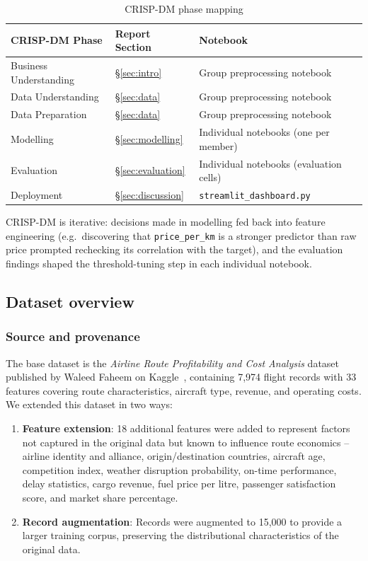 \documentclass[12pt,a4paper]{article}
\begin{document}
\begin{table}[H]
  \centering
  \caption{CRISP-DM phase mapping}
  \label{tab:crispdm}
  \small
  \begin{tabular}{L{3cm} L{4.5cm} L{5cm}}
    \toprule
    \textbf{CRISP-DM Phase} & \textbf{Report Section} & \textbf{Notebook} \\
    \midrule
    Business Understanding & \S\ref{sec:intro} & Group preprocessing notebook \\
    Data Understanding     & \S\ref{sec:data} & Group preprocessing notebook \\
    Data Preparation       & \S\ref{sec:data} & Group preprocessing notebook \\
    Modelling              & \S\ref{sec:modelling} & Individual notebooks (one per member) \\
    Evaluation             & \S\ref{sec:evaluation} & Individual notebooks (evaluation cells) \\
    Deployment             & \S\ref{sec:discussion} & \texttt{streamlit\_dashboard.py} \\
    \bottomrule
  \end{tabular}
\end{table}

CRISP-DM is iterative: decisions made in modelling fed back into feature engineering (e.g.\ discovering that \texttt{price\_per\_km} is a stronger predictor than raw price prompted rechecking its correlation with the target), and the evaluation findings shaped the threshold-tuning step in each individual notebook.

\subsection{Dataset overview}
\label{subsec:dataset}

\subsubsection{Source and provenance}

The base dataset is the \emph{Airline Route Profitability and Cost Analysis} dataset published by Waleed Faheem on Kaggle~\cite{faheem2024kaggle}, containing 7,974 flight records with 33 features covering route characteristics, aircraft type, revenue, and operating costs. We extended this dataset in two ways:

\begin{enumerate}[leftmargin=*]
  \item \textbf{Feature extension}: 18 additional features were added to represent factors not captured in the original data but known to influence route economics -- airline identity and alliance, origin/destination countries, aircraft age, competition index, weather disruption probability, on-time performance, delay statistics, cargo revenue, fuel price per litre, passenger satisfaction score, and market share percentage.
  \item \textbf{Record augmentation}: Records were augmented to 15,000 to provide a larger training corpus, preserving the distributional characteristics of the original data.
\end{enumerate}
\end{document}
